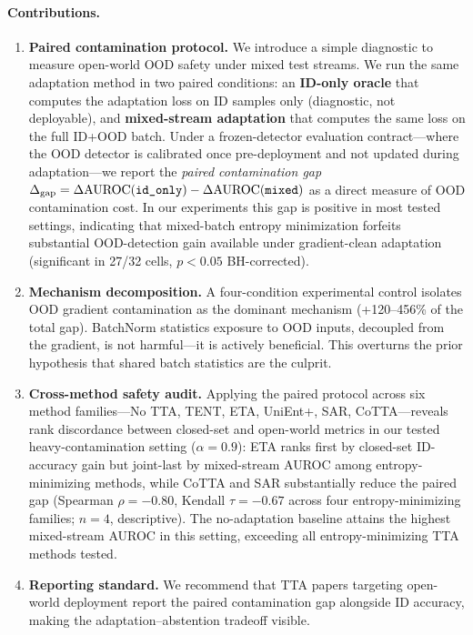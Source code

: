 \paragraph{Contributions.}
\begin{enumerate}[leftmargin=*,topsep=2pt,itemsep=1pt]
  \item \textbf{Paired contamination protocol.} We introduce a simple diagnostic to measure open-world OOD safety under mixed test streams. We run the same adaptation method in two paired conditions: an \textbf{ID-only oracle} that computes the adaptation loss on ID samples only (diagnostic, not deployable), and \textbf{mixed-stream adaptation} that computes the same loss on the full ID+OOD batch. Under a frozen-detector evaluation contract---where the OOD detector is calibrated once pre-deployment and not updated during adaptation---we report the \emph{paired contamination gap} $\Delta_{\text{gap}} = \Delta\text{AUROC}(\texttt{id\_only}) - \Delta\text{AUROC}(\texttt{mixed})$ as a direct measure of OOD contamination cost. In our experiments this gap is positive in most tested settings, indicating that mixed-batch entropy minimization forfeits substantial OOD-detection gain available under gradient-clean adaptation (significant in 27/32 cells, $p < 0.05$ BH-corrected).

  \item \textbf{Mechanism decomposition.} A four-condition experimental control isolates OOD gradient contamination as the dominant mechanism (+120--456\% of the total gap). BatchNorm statistics exposure to OOD inputs, decoupled from the gradient, is not harmful---it is actively beneficial. This overturns the prior hypothesis that shared batch statistics are the culprit.

  \item \textbf{Cross-method safety audit.} Applying the paired protocol across six method families---No TTA, TENT, ETA, UniEnt+, SAR, CoTTA---reveals rank discordance between closed-set and open-world metrics in our tested heavy-contamination setting ($\alpha = 0.9$): ETA ranks first by closed-set ID-accuracy gain but joint-last by mixed-stream AUROC among entropy-minimizing methods, while CoTTA and SAR substantially reduce the paired gap (Spearman $\rho = -0.80$, Kendall $\tau = -0.67$ across four entropy-minimizing families; $n{=}4$, descriptive). The no-adaptation baseline attains the highest mixed-stream AUROC in this setting, exceeding all entropy-minimizing TTA methods tested.

  \item \textbf{Reporting standard.} We recommend that TTA papers targeting open-world deployment report the paired contamination gap alongside ID accuracy, making the adaptation--abstention tradeoff visible.
\end{enumerate}


